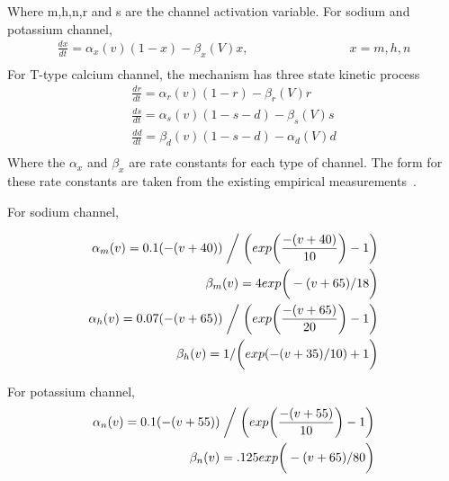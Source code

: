Where m,h,n,r and s are the channel activation variable. 
For sodium and potassium channel,
\begin{align*}
\frac{dx}{dt} = \alpha_{x}(v)(1-x) - \beta_{x}(V)x, \hspace{8em}  x = m,h,n \\
\end{align*}
For T-type calcium channel, the mechanism has three state kinetic process
\begin{align*}
\frac{dr}{dt} = \alpha_{r}(v)(1-r) - \beta_r(V)r \\
\frac{ds}{dt} = \alpha_{s}(v)(1-s-d) - \beta_{s}(V)s \\
\frac{d d}{dt} = \beta_{d}(v)(1-s-d) - \alpha_d(V)d \\
\end{align*}
Where the $\alpha_x$ and $\beta_x$ are rate constants for each type of channel. The form for these rate constants are taken from the existing empirical measurements~\cite{hodgkin1952quantitative,carnevale2006neuron, wang1991model}.

For sodium channel, %

\begin{align*} 
\alpha_{m}(v) = 0.1(-(v+40))  \biggm/  \bigg( exp \bigg( \frac{-(v+40)}{10} \bigg) - 1 \bigg)\\
\beta_{m}(v) = 4 exp \bigg(-(v+65)/18\bigg)\\
\alpha_{h}(v) = 0.07(-(v+65))  \biggm/  \bigg( exp \bigg( \frac{-(v+65)}{20} \bigg) - 1 \bigg)\\
\beta_{h}(v) = 1 / \bigg( exp (-(v+35)/10) + 1 \bigg)\\
\end{align*}

For potassium channel, %
\begin{align*}
\alpha_{n}(v) = 0.1(-(v+55))  \biggm/  \bigg( exp \bigg( \frac{-(v+55)}{10} \bigg) - 1 \bigg)\\
\beta_{n}(v) = .125 exp \bigg(-(v+65)/80\bigg)\\
\end{align*}

